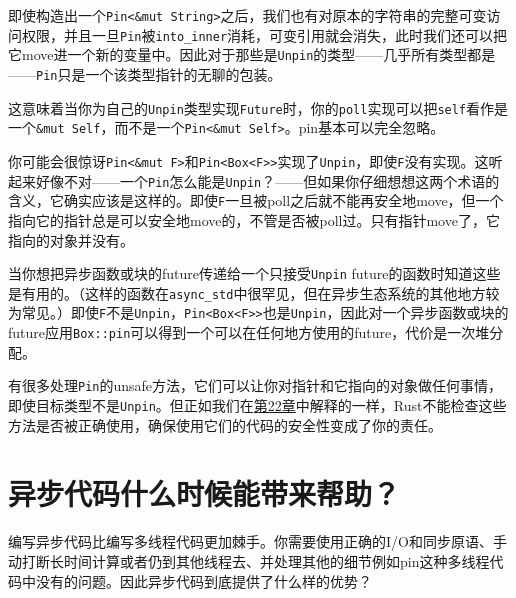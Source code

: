 即使构造出一个\texttt{Pin<\&mut String>}之后，我们也有对原本的字符串的完整可变访问权限，并且一旦\texttt{Pin}被\texttt{into\_inner}消耗，可变引用就会消失，此时我们还可以把它move进一个新的变量中。因此对于那些是\texttt{Unpin}的类型——几乎所有类型都是——\texttt{Pin}只是一个该类型指针的无聊的包装。

这意味着当你为自己的\texttt{Unpin}类型实现\texttt{Future}时，你的\texttt{poll}实现可以把\texttt{self}看作是一个\texttt{\&mut Self}，而不是一个\texttt{Pin<\&mut Self>}。pin基本可以完全忽略。

你可能会很惊讶\texttt{Pin<\&mut F>}和\texttt{Pin<Box<F>>}实现了\texttt{Unpin}，即使\texttt{F}没有实现。这听起来好像不对——一个\texttt{Pin}怎么能是\texttt{Unpin}？——但如果你仔细想想这两个术语的含义，它确实应该是这样的。即使\texttt{F}一旦被poll之后就不能再安全地move，但一个指向它的指针总是可以安全地move的，不管是否被poll过。只有指针move了，它指向的对象并没有。

当你想把异步函数或块的future传递给一个只接受\texttt{Unpin} future的函数时知道这些是有用的。（这样的函数在\texttt{async\_std}中很罕见，但在异步生态系统的其他地方较为常见。）即使\texttt{F}不是\texttt{Unpin}，\texttt{Pin<Box<F>>}也是\texttt{Unpin}，因此对一个异步函数或块的future应用\texttt{Box::pin}可以得到一个可以在任何地方使用的future，代价是一次堆分配。

有很多处理\texttt{Pin}的unsafe方法，它们可以让你对指针和它指向的对象做任何事情，即使目标类型不是\texttt{Unpin}。但正如我们在\hyperref[ch22]{第22章}中解释的一样，Rust不能检查这些方法是否被正确使用，确保使用它们的代码的安全性变成了你的责任。

\section{异步代码什么时候能带来帮助？}

编写异步代码比编写多线程代码更加棘手。你需要使用正确的I/O和同步原语、手动打断长时间计算或者仍到其他线程去、并处理其他的细节例如pin这种多线程代码中没有的问题。因此异步代码到底提供了什么样的优势？


